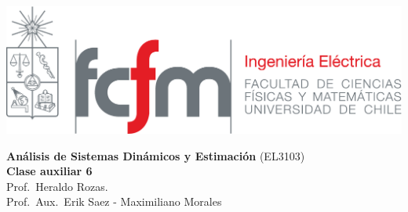 \documentclass[
  11pt,
  letterpaper,
   addpoints,
   answers
  ]{exam}
\begin{document}
\noindent
\begin{minipage}{0.47\textwidth}
\includegraphics[width=\textwidth]{../fcfm_die}
\end{minipage}
\begin{minipage}{0.53\textwidth}
\begin{center} 
\large\textbf{Análisis de Sistemas Dinámicos y Estimación} (EL3103) \\
\large\textbf{Clase auxiliar 6} \\
\normalsize Prof.~Heraldo Rozas.\\
\normalsize Prof.~Aux.~Erik Saez - Maximiliano Morales
\end{center}
\end{minipage}

\vspace{0.5cm}
\noindent
\vspace{.85cm}
\end{document}

